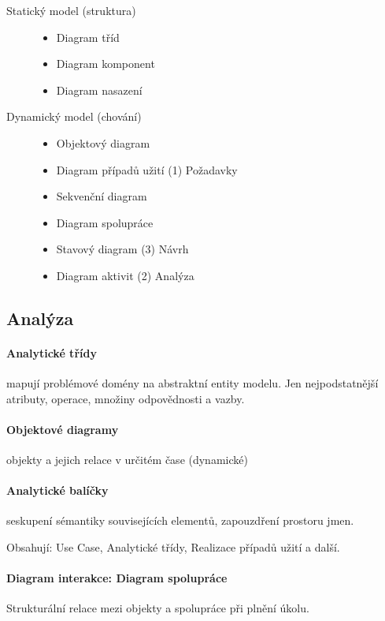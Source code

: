 \documentclass[a4paper, 11pt]{report}
\begin{document}
\begin{description}
	\item[Statický model (struktura)] \hfill
	\begin{itemize}
		\item Diagram tříd
		\item Diagram komponent
		\item Diagram nasazení
	\end{itemize}
	\item[Dynamický model (chování)] \hfill
	\begin{itemize}
		\item Objektový diagram
		\item Diagram případů užití (1) Požadavky
		\item Sekvenční diagram
		\item Diagram spolupráce
		\item Stavový diagram (3) Návrh
		\item Diagram aktivit (2) Analýza
	\end{itemize}
\end{description}

\subsection{Analýza}

\paragraph{Analytické třídy}
mapují problémové domény na abstraktní entity modelu. Jen nejpodstatnější atributy, operace, množiny odpovědnosti a vazby.

\paragraph{Objektové diagramy}
objekty a jejich relace v určitém čase (dynamické)

\paragraph{Analytické balíčky}
seskupení sémantiky souvisejících elementů, zapouzdření prostoru jmen.

Obsahují: Use Case, Analytické třídy, Realizace případů užití a další.

\paragraph{Diagram interakce: Diagram spolupráce}
Strukturální relace mezi objekty a spolupráce při plnění úkolu.
\end{document}
